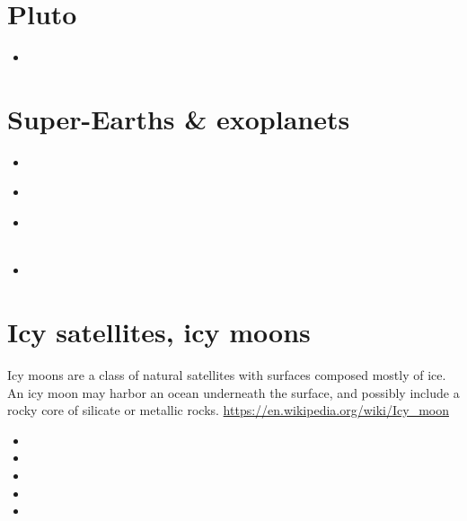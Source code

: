 \section{Pluto}

\begin{scriptsize}
\begin{itemize}
\item[\twothousandsixteen] 
\end{itemize}
\end{scriptsize}

\section{Super-Earths \& exoplanets}

\begin{scriptsize}
\begin{itemize}
\item[\twothousandeleven]
  \\
\item[\twothousandthirteen]
\item[\twothousandfifteen] 
  \\
  \\
\item[\twothousandtwentythree] 
\end{itemize}
\end{scriptsize}

\section{Icy satellites, icy moons}

Icy moons are a class of natural satellites with surfaces composed mostly of ice. 
An icy moon may harbor an ocean underneath the surface, and possibly include a rocky 
core of silicate or metallic rocks.
\url{https://en.wikipedia.org/wiki/Icy_moon}

\begin{scriptsize}
\begin{itemize}
\item[\twothousandone] 
\item[\twothousandtwelve] 
\item[\twothousandseventeen] 
\item[\twothousandnineteen] 
\item[\twothousandtwenty] 
\end{itemize}
\end{scriptsize}

